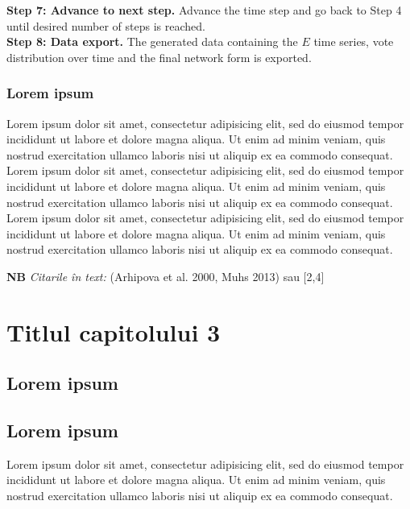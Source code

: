 \documentclass[12pt,openright,twoside]{book}
\begin{document}
\textbf{Step 7: Advance to next step.} Advance the time step and go back to Step 4 until desired number of steps is reached.\\

\textbf{Step 8: Data export.} The generated data containing the $E$ time series, vote distribution over time and the final network form is exported.\\  

\subsection{Lorem ipsum}

Lorem ipsum dolor sit amet, consectetur adipisicing elit, sed do eiusmod tempor incididunt ut labore et dolore magna aliqua. Ut enim ad minim veniam, quis nostrud exercitation ullamco laboris nisi ut aliquip ex ea commodo consequat.\\

Lorem ipsum dolor sit amet, consectetur adipisicing elit, sed do eiusmod tempor incididunt ut labore et dolore magna aliqua. Ut enim ad minim veniam, quis nostrud exercitation ullamco laboris nisi ut aliquip ex ea commodo consequat.\\

Lorem ipsum dolor sit amet, consectetur adipisicing elit, sed do eiusmod tempor incididunt ut labore et dolore magna aliqua. Ut enim ad minim veniam, quis nostrud exercitation ullamco laboris nisi ut aliquip ex ea commodo consequat.\\

\vspace{40pt}


\noindent\textbf{NB} \textit{Citarile \^in text: }(Arhipova et al. 2000, Muhs 2013) sau [2,4]



\chapter{Titlul capitolului 3}

\section{Lorem ipsum }

\section{Lorem ipsum }

Lorem ipsum dolor sit amet, consectetur adipisicing elit, sed do eiusmod tempor incididunt ut labore et dolore magna aliqua. Ut enim ad minim veniam, quis nostrud exercitation ullamco laboris nisi ut aliquip ex ea commodo consequat. \\
\end{document}
